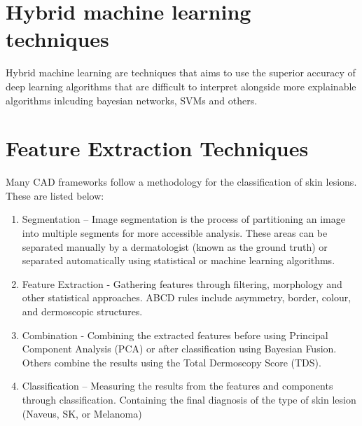 
\section{Hybrid machine learning techniques}
Hybrid machine learning are techniques that aims to use the superior accuracy of deep learning algorithms that are difficult to interpret alongside more explainable algorithms inlcuding bayesian networks, SVMs and others.

\section{Feature Extraction Techniques}
Many CAD frameworks follow a methodology for the classification of skin lesions. These are listed below:

\begin{enumerate}

	\item Segmentation – Image segmentation is the process of partitioning an image into multiple segments for more accessible analysis. These areas can be separated manually by a dermatologist (known as the ground truth) or separated automatically using statistical or machine learning algorithms.

	\item Feature Extraction - Gathering features through filtering, morphology and other statistical approaches. ABCD rules include asymmetry, border, colour, and dermoscopic structures.

	\item Combination - Combining the extracted features before using Principal Component Analysis (PCA) or after classification using Bayesian Fusion. Others combine the results using the Total Dermoscopy Score (TDS).

	\item Classification – Measuring the results from the features and components through classification. Containing the final diagnosis of the type of skin lesion (Naveus, SK, or Melanoma)

\end{enumerate}

